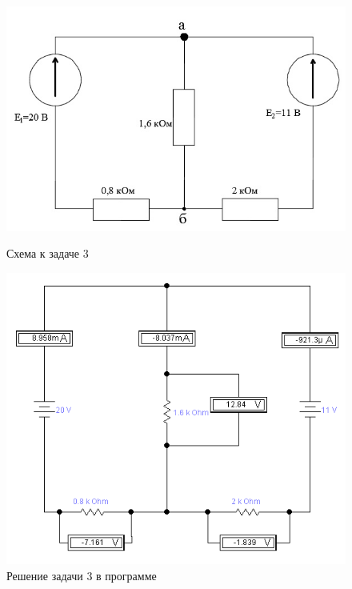 \begin{figure}[H]
\vspace{-12pt}
  \begin{center}
    \begin{minipage}[h]{0.5\linewidth}
        \includegraphics[width=1\textwidth]{authors/stepanuk-2-fig-5.png}
        \caption{Схема к задаче 3}
        \label{fig:stepanuk-2-fig-5}
    \end{minipage}
\hfill
    \begin{minipage}[h]{0.4\linewidth}
        \includegraphics[width=1\textwidth]{authors/stepanuk-2-fig-6.png}
        \caption{Решение задачи 3 в программе}
        \label{fig:stepanuk-2-fig-6}
    \end{minipage}


  \end{center}
\vspace{-12pt}
\end{figure}
